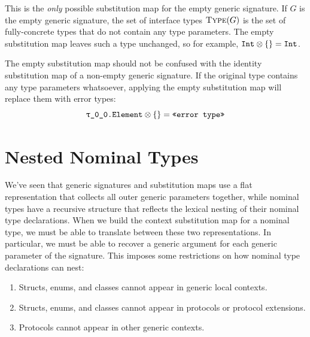 \documentclass[../generics]{subfiles}
\begin{document}
This is the \emph{only} possible substitution map for the empty generic signature. If $G$ is the empty generic signature, the set of interface types $\textsc{Type}({G})$ is the set of fully-concrete types that do not contain any type parameters. The empty substitution map leaves such a type unchanged, so for example, $\texttt{Int}\otimes\{\} = \texttt{Int}$.

The empty substitution map should not be confused with the identity substitution map of a non-empty generic signature. If the original type contains any type parameters whatsoever, applying the empty substitution map will replace them with error types:
\[\texttt{\rT.Element} \otimes \SubstMap{} = \texttt{<<error type>>}\]

\section{Nested Nominal Types}\label{nested nominal types}

We've seen that generic signatures and substitution maps use a flat representation that collects all outer generic parameters together, while nominal types have a recursive structure that reflects the lexical nesting of their nominal type declarations. When we build the context substitution map for a nominal type, we must be able to translate between these two representations. In particular, we must be able to recover a generic argument for each generic parameter of the signature. This imposes some restrictions on how nominal type declarations can nest:
\begin{enumerate}
\item Structs, enums, and classes cannot appear in generic local contexts.
\item Structs, enums, and classes cannot appear in protocols or protocol extensions.
\item Protocols cannot appear in other generic contexts.
\end{enumerate}
\end{document}
